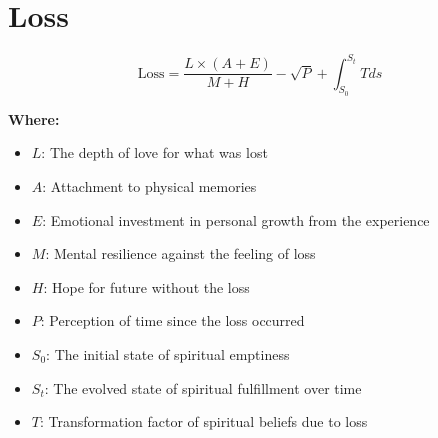 \chapter{Loss}

\begin{equation}
\text{Loss} = \frac{L \times (A + E)}{M + H} - \sqrt{P} + \int_{S_0}^{S_t} T ds
\end{equation}

\textbf{Where:}

\begin{itemize}
    \item $L$: The depth of love for what was lost
    \item $A$: Attachment to physical memories
    \item $E$: Emotional investment in personal growth from the experience
    \item $M$: Mental resilience against the feeling of loss
    \item $H$: Hope for future without the loss
    \item $P$: Perception of time since the loss occurred
    \item $S_0$: The initial state of spiritual emptiness
    \item $S_t$: The evolved state of spiritual fulfillment over time
    \item $T$: Transformation factor of spiritual beliefs due to loss
\end{itemize}